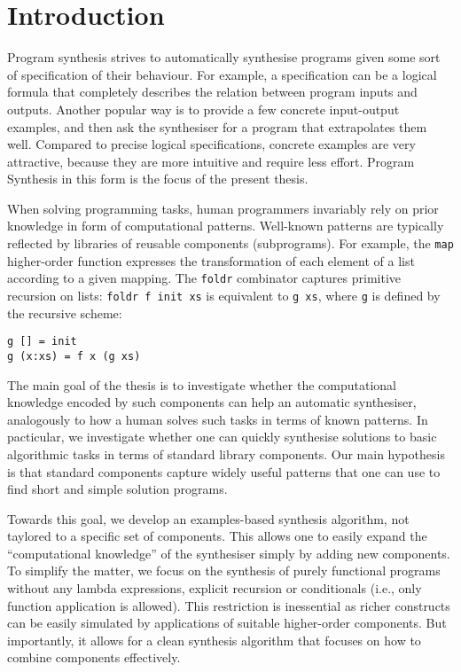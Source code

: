 \lstset{style=plain}

\chapter{Introduction}\label{ch:introduction}
Program synthesis strives to automatically synthesise programs given some sort of specification of their behaviour.   For example, a specification can be a logical formula that completely describes the relation between program inputs and outputs.  Another popular way is to provide a few concrete input-output examples, and then ask the synthesiser for a program that extrapolates them well.  Compared to precise logical specifications, concrete examples are very attractive, because they are more intuitive and require less effort.  Program Synthesis in this form is the focus of the present thesis.

When solving programming tasks, human programmers invariably rely on prior knowledge in form of computational patterns.  Well-known patterns are typically reflected by libraries of reusable components (subprograms).  For example, the \lstinline!map! higher-order function expresses the transformation of each element of a list according to a given mapping.  The \lstinline!foldr! combinator captures primitive recursion on lists: \lstinline!foldr f init xs! is equivalent to \lstinline!g xs!, where \lstinline!g! is defined by the recursive scheme:
\begin{lstlisting}[style=plain]
g [] = init
g (x:xs) = f x (g xs)
\end{lstlisting}

The main goal of the thesis is to investigate whether the computational knowledge encoded by such components can help an automatic synthesiser, analogously to how a human solves such tasks in terms of known patterns.  In pacticular, we investigate whether one can quickly synthesise solutions to basic algorithmic tasks in terms of standard library components.  Our main hypothesis is that standard components capture widely useful patterns that one can use to find short and simple solution programs.

Towards this goal, we develop an examples-based synthesis algorithm, not taylored to a specific set of components.  This allows one to easily expand the ``computational knowledge'' of the synthesiser simply by adding new components.  To simplify the matter, we focus on the synthesis of purely functional programs without any lambda expressions, explicit recursion or conditionals (i.e., only function application is allowed).  This restriction is inessential as richer constructs can be easily simulated by applications of suitable higher-order components.  But importantly, it allows for a clean synthesis algorithm that focuses on how to combine components effectively.

